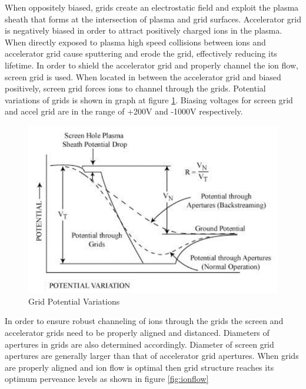 When oppositely biased, grids create an electrostatic field and exploit the plasma sheath that forms at the intersection of plasma and grid surfaces.
 Accelerator grid is negatively biased in order to attract positively charged ions in the plasma. When directly exposed to plasma high speed collisions between ions and accelerator grid cause sputtering and erode the grid, effectively reducing its lifetime. In order to shield the accelerator grid and properly channel the ion flow, screen grid is used. When located in between the accelerator grid and biased positively, screen grid forces ions to channel through the grids. Potential variations of grids is shown in graph at figure \ref{fig:potvariation}.
 Biasing voltages for screen grid and accel grid are in the range of +200V and -1000V respectively. 
\newpage
 \begin{figure}[ht]
     \centering
     \includegraphics[scale=0.9]{fig/potvariation.png}
     \caption[Grid Potential Variations]{Grid Potential Variations\cite{OCW1964}}
     \label{fig:potvariation}
 \end{figure}
  
 In order to ensure robust channeling of ions through the grids the screen and accelerator grids need to be properly aligned and distanced. Diameters of apertures in grids are also determined accordingly. Diameter of screen grid apertures are generally larger than that of accelerator grid apertures. When grids are properly aligned and ion flow is optimal then grid structure reaches its optimum perveance levels as shown in figure \ref{fig:ionflow}

